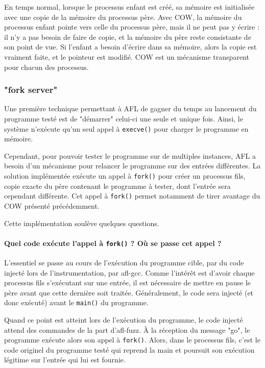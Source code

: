 En temps normal, lorsque le processus enfant est créé, sa mémoire est initialisée avec une copie de la mémoire du processus père.
Avec COW, la mémoire du processus enfant pointe vers celle du processus père, mais il ne peut pas y écrire : il n'y a pas besoin de faire de copie, et la mémoire du père reste consistante de son point de vue.
Si l'enfant a besoin d'écrire dans sa mémoire, alors la copie est vraiment faite, et le pointeur est modifié.
COW est un mécanisme transparent pour chacun des processus.

\subsubsection{"fork server"}
Une première technique permettant à AFL de gagner du temps au lancement du programme testé est de "démarrer" celui-ci une seule et unique fois.
Ainsi, le système n'exécute qu'un seul appel à \lstinline{execve()} pour charger le programme en mémoire.

Cependant, pour pouvoir tester le programme sur de multiples instances, AFL a besoin d'un mécanisme pour relancer le programme sur des entrées différentes.
La solution implémentée exécute un appel à \lstinline{fork()} pour créer un processus fils, copie exacte du père contenant le programme à tester, dont l'entrée sera cependant différente.
Cet appel à \lstinline{fork()} permet notamment de tirer avantage du COW présenté précédemment.

Cette implémentation soulève quelques questions.

\paragraph{Quel code exécute l'appel à \lstinline{fork()} ? Où se passe cet appel ?}

L'essentiel se passe au cours de l'exécution du programme cible, par du code injecté lors de l'instrumentation, par afl-gcc.
Comme l'intérêt est d'avoir chaque processus fils s'exécutant sur une entrée, il est nécessaire de mettre en pause le père avant que cette dernière soit traitée.
Généralement, le code sera injecté (et donc exécuté) avant le \lstinline{main()} du programme.

Quand ce point est atteint lors de l'exécution du programme, le code injecté attend des commandes de la part d'afl-fuzz.
À la réception du message "go", le programme exécute alors son appel à \lstinline{fork()}.
Alors, dans le processus fils, c'est le code originel du programme testé qui reprend la main et poursuit son exécution légitime sur l'entrée qui lui est fournie.

